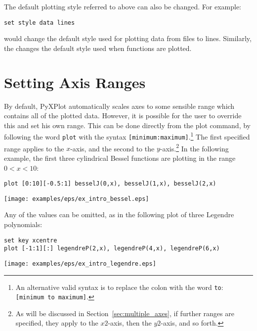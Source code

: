 The default plotting style referred to above can also be changed.  For example:

\begin{verbatim}
set style data lines
\end{verbatim}

\noindent would change the default style used for plotting data from files to
lines. Similarly, the  changes the default style
used when functions are plotted.


\section{Setting Axis Ranges}
\label{sec:plot_ranges}

By default, PyXPlot automatically scales axes to some sensible range which
contains all of the plotted data. However, it is possible for the user to
override this and set his own range. This can be
done directly from the plot command, by following the word {\tt plot} with the
syntax {\tt [minimum:maximum]}.\footnote{An alternative valid syntax is to
replace the colon with the word {\tt to}: {\tt [minimum to maximum]}.} The
first specified range applies to the $x$-axis, and the second to the
$y$-axis.\footnote{As will be discussed in Section~\ref{sec:multiple_axes}, if
further ranges are specified, they apply to the $x2$-axis, then the $y2$-axis,
and so forth.} In the following example, the first three cylindrical Bessel
functions are plotting in the range $0<x<10$:

\begin{verbatim}
plot [0:10][-0.5:1] besselJ(0,x), besselJ(1,x), besselJ(2,x)
\end{verbatim}
\begin{center}
\texttt{[image: examples/eps/ex\_intro\_bessel.eps]}
\end{center}

\noindent Any of the values can be omitted, as in the following plot of
three Legendre polynomials:

\begin{verbatim}
set key xcentre
plot [-1:1][:] legendreP(2,x), legendreP(4,x), legendreP(6,x)
\end{verbatim}
\begin{center}
\texttt{[image: examples/eps/ex\_intro\_legendre.eps]}
\end{center}

